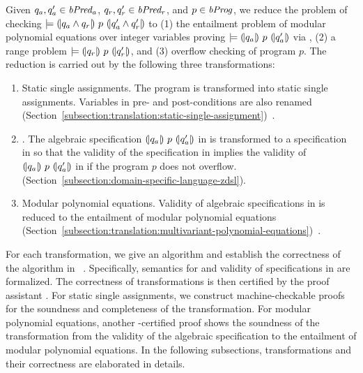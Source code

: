 
Given $q_a, q_a' \in \mathit{bPred_a}$, $q_r, q_r' \in \mathit{bPred_r}$, and $p \in \mathit{bProg}$, we reduce the problem of checking $\models {(\!|}{q_a \wedge q_r}{|\!)}~{p}~{(\!|}{q_a' \wedge q_r'}{|\!)}$ to (1) the entailment problem of modular
polynomial equations over integer variables proving $\models {(\!|}{q_a}{|\!)}~{p}~{(\!|}{q_a'}{|\!)}$ via \zdsl, (2) a range problem $\models {(\!|}{q_r}{|\!)}~{p}~{(\!|}{q_r'}{|\!)}$, and (3) overflow checking of program $p$.
The reduction is carried out by the following three transformations:
\begin{enumerate}
\item Static single assignments. The program is transformed
  into static single assignments. Variables in pre- and
  post-conditions are also renamed
  (Section~\ref{subsection:translation:static-single-assignment})~\cite{AWZ:88:DQVP}.
\item \zdsl. The algebraic specification ${(\!|}{q_a}{|\!)}~{p}~{(\!|}{q_a'}{|\!)}$ in \bvdsl is transformed to a specification in \zdsl so that the validity of the specification in \zdsl implies the validity of ${(\!|}{q_a}{|\!)}~{p}~{(\!|}{q_a'}{|\!)}$ in \bvdsl if the program $p$ does not overflow. (Section~\ref{subsection:domain-specific-language-zdsl}).
\item Modular polynomial equations. Validity of algebraic specifications in \zdsl
  is reduced to the entailment of modular polynomial equations
  (Section~\ref{subsection:translation:multivariant-polynomial-equations})~\cite{H:07:AENTP}.
\end{enumerate}

For each transformation, we give an algorithm and establish the
correctness of the algorithm in \coq~\cite{YC:2004:ITPPDC}.
Specifically, semantics for \zdsl and validity of specifications in \zdsl are formalized.
The correctness of transformations is then certified by the proof assistant \coq.
For static single assignments, we
construct machine-checkable proofs for the soundness and completeness
of the transformation. For modular polynomial equations, another
\coq-certified proof shows the soundness of the transformation
from the validity of the algebraic specification to the entailment of
modular polynomial equations. In the following subsections,
transformations and their correctness are elaborated in details.
